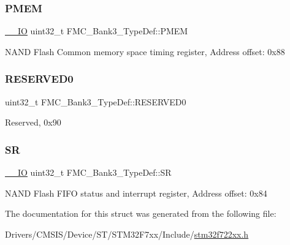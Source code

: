\subsubsection{\texorpdfstring{PMEM}{PMEM}}
{\footnotesize\ttfamily \mbox{\hyperlink{core__sc300_8h_aec43007d9998a0a0e01faede4133d6be}{\+\_\+\+\_\+\+IO}} uint32\+\_\+t F\+M\+C\+\_\+\+Bank3\+\_\+\+Type\+Def\+::\+P\+M\+EM}

N\+A\+ND Flash Common memory space timing register, Address offset\+: 0x88 \mbox{\label{struct_f_m_c___bank3___type_def_a0d8de7951a4d20a659b4d3abe76bd78f}} 
\subsubsection{\texorpdfstring{RESERVED0}{RESERVED0}}
{\footnotesize\ttfamily uint32\+\_\+t F\+M\+C\+\_\+\+Bank3\+\_\+\+Type\+Def\+::\+R\+E\+S\+E\+R\+V\+E\+D0}

Reserved, 0x90 \mbox{\label{struct_f_m_c___bank3___type_def_a43af4c901144f747741adbf1a479586a}} 
\subsubsection{\texorpdfstring{SR}{SR}}
{\footnotesize\ttfamily \mbox{\hyperlink{core__sc300_8h_aec43007d9998a0a0e01faede4133d6be}{\+\_\+\+\_\+\+IO}} uint32\+\_\+t F\+M\+C\+\_\+\+Bank3\+\_\+\+Type\+Def\+::\+SR}

N\+A\+ND Flash F\+I\+FO status and interrupt register, Address offset\+: 0x84 

The documentation for this struct was generated from the following file\+:\begin{DoxyCompactItemize}
\item 
Drivers/\+C\+M\+S\+I\+S/\+Device/\+S\+T/\+S\+T\+M32\+F7xx/\+Include/\mbox{\hyperlink{stm32f722xx_8h}{stm32f722xx.\+h}}\end{DoxyCompactItemize}

